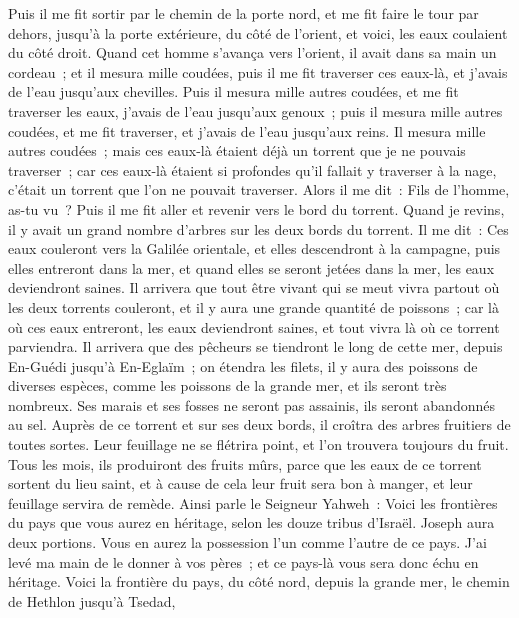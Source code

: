 \begin{multicols}{2}
Puis il me fit sortir par le chemin de la porte nord, et me fit faire le tour par dehors, jusqu'à la porte extérieure, du côté de l'orient, et voici, les eaux coulaient du côté droit.
Quand cet homme s'avança vers l'orient, il avait dans sa main un cordeau~; et il mesura mille coudées, puis il me fit traverser ces eaux-là, et j'avais de l'eau jusqu'aux chevilles.
Puis il mesura mille autres coudées, et me fit traverser les eaux, j'avais de l'eau jusqu'aux genoux~; puis il mesura mille autres coudées, et me fit traverser, et j'avais de l'eau jusqu'aux reins.
Il mesura mille autres coudées~; mais ces eaux-là étaient déjà un torrent que je ne pouvais traverser~; car ces eaux-là étaient si profondes qu'il fallait y traverser à la nage, c'était un torrent que l'on ne pouvait traverser.
Alors il me dit~: Fils de l'homme, as-tu vu~? Puis il me fit aller et revenir vers le bord du torrent.
Quand je revins, il y avait un grand nombre d'arbres sur les deux bords du torrent.
Il me dit~: Ces eaux couleront vers la Galilée orientale, et elles descendront à la campagne, puis elles entreront dans la mer, et quand elles se seront jetées dans la mer, les eaux deviendront saines.
Il arrivera que tout être vivant qui se meut vivra partout où les deux torrents couleront, et il y aura une grande quantité de poissons~; car là où ces eaux entreront, les eaux deviendront saines, et tout vivra là où ce torrent parviendra.
Il arrivera que des pêcheurs se tiendront le long de cette mer, depuis En-Guédi jusqu'à En-Eglaïm~; on étendra les filets, il y aura des poissons de diverses espèces, comme les poissons de la grande mer, et ils seront très nombreux.
Ses marais et ses fosses ne seront pas assainis, ils seront abandonnés au sel.
Auprès de ce torrent et sur ses deux bords, il croîtra des arbres fruitiers de toutes sortes. Leur feuillage ne se flétrira point, et l'on trouvera toujours du fruit. Tous les mois, ils produiront des fruits mûrs, parce que les eaux de ce torrent sortent du lieu saint, et à cause de cela leur fruit sera bon à manger, et leur feuillage servira de remède.
Ainsi parle le Seigneur Yahweh~: Voici les frontières du pays que vous aurez en héritage, selon les douze tribus d'Israël. Joseph aura deux portions.
Vous en aurez la possession l'un comme l'autre de ce pays. J'ai levé ma main de le donner à vos pères~; et ce pays-là vous sera donc échu en héritage.
Voici la frontière du pays, du côté nord, depuis la grande mer, le chemin de Hethlon jusqu'à Tsedad,

\end{multicols}
